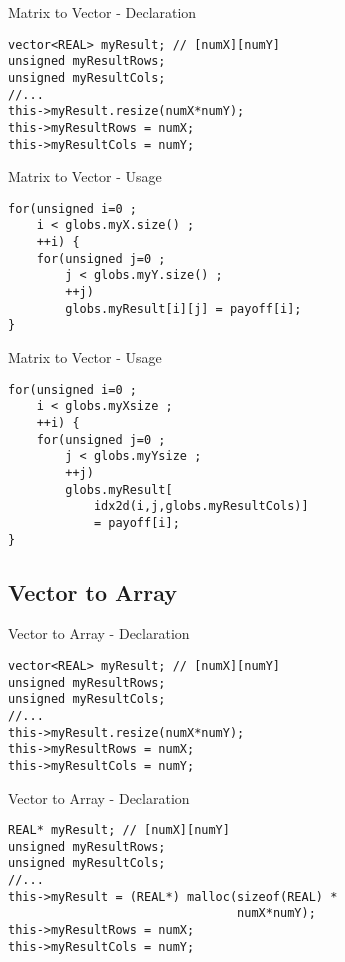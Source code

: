 \documentclass[xcolor=x11names,compress]{beamer}
\begin{document}
\begin{frame}[fragile]{Matrix to Vector - Declaration}
\begin{verbatim}
vector<REAL> myResult; // [numX][numY]
unsigned myResultRows;
unsigned myResultCols;
//...
this->myResult.resize(numX*numY);
this->myResultRows = numX;
this->myResultCols = numY;
\end{verbatim}
\end{frame}

\begin{frame}[fragile]{Matrix to Vector - Usage}
\begin{verbatim}
for(unsigned i=0 ;
    i < globs.myX.size() ;
    ++i) {
    for(unsigned j=0 ;
        j < globs.myY.size() ;
        ++j) 
        globs.myResult[i][j] = payoff[i];
}
\end{verbatim}
\end{frame}

\begin{frame}[fragile]{Matrix to Vector - Usage}
\begin{verbatim}
for(unsigned i=0 ;
    i < globs.myXsize ;
    ++i) {
    for(unsigned j=0 ;
        j < globs.myYsize ;
        ++j) 
        globs.myResult[
            idx2d(i,j,globs.myResultCols)]
            = payoff[i];
}
\end{verbatim}
\end{frame}


\subsection{Vector to Array}
\begin{frame}[fragile]{Vector to Array - Declaration}
\begin{verbatim}
vector<REAL> myResult; // [numX][numY]
unsigned myResultRows;
unsigned myResultCols;
//...
this->myResult.resize(numX*numY);
this->myResultRows = numX;
this->myResultCols = numY;
\end{verbatim}
\end{frame}

\begin{frame}[fragile]{Vector to Array - Declaration}
\begin{verbatim}
REAL* myResult; // [numX][numY]
unsigned myResultRows;
unsigned myResultCols;
//...
this->myResult = (REAL*) malloc(sizeof(REAL) *
                                numX*numY);
this->myResultRows = numX;
this->myResultCols = numY;
\end{verbatim}
\end{frame}
\end{document}
